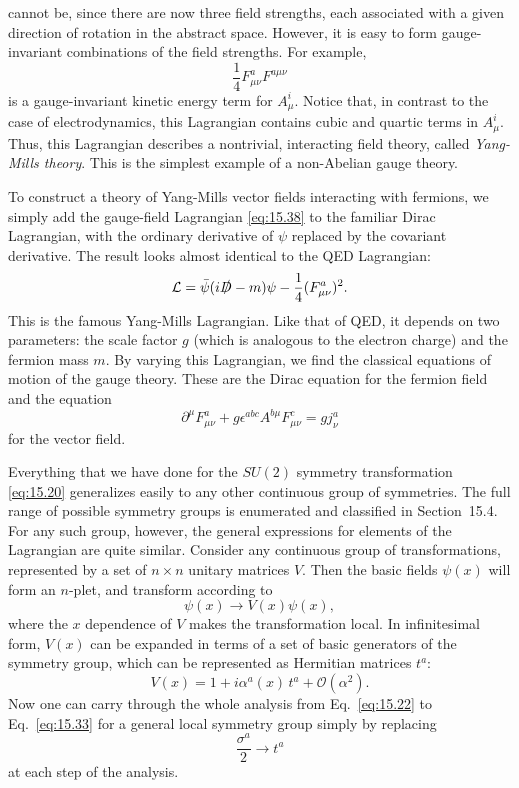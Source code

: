 cannot be, since there are now three field strengths, each associated with a
given direction of rotation in the abstract space.  However, it is easy to
form gauge-invariant combinations of the field strengths.  For example,
\begin{equation}
  \frac{1}{4}F^a_{\mu\nu}F^{a\mu\nu}
  \label{eq:15.38}
\end{equation}
is a gauge-invariant kinetic energy term for $A_\mu^i$.  Notice that, in
contrast to the case of electrodynamics, this Lagrangian contains cubic and
quartic terms in $A_\mu^i$.  Thus, this Lagrangian describes a nontrivial,
interacting field theory, called \emph{Yang-Mills theory}.  This is the
simplest example of a non-Abelian gauge theory.

To construct a theory of Yang-Mills vector fields interacting with fermions,
we simply add the gauge-field Lagrangian \eqref{eq:15.38} to the familiar
Dirac Lagrangian, with the ordinary derivative of $\psi$ replaced by the
covariant derivative.  The result looks almost identical to the QED
Lagrangian:
\begin{equation}
  \mathcal{L} = \bar{\psi}(i\slashed{D} - m)\psi - \frac{1}{4}(F^a_{\mu\nu})^2 .
  \label{eq:15.39}
\end{equation}
This is the famous Yang-Mills Lagrangian.  Like that of QED, it depends on
two parameters: the scale factor $g$ (which is analogous to the electron
charge) and the fermion mass $m$.  By varying this Lagrangian, we find the
classical equations of motion of the gauge theory.  These are the Dirac
equation for the fermion field and the equation
\begin{equation}
  \partial^\mu F^a_{\mu\nu} + g\epsilon^{abc}A^{b\mu}F^c_{\mu\nu} = gj^a_\nu
  \label{eq:15.40}
\end{equation}
for the vector field.

Everything that we have done for the $SU(2)$ symmetry transformation
\eqref{eq:15.20} generalizes easily to any other continuous group of
symmetries.  The full range of possible symmetry groups is enumerated and
classified in Section~15.4.  For any such group, however, the general
expressions for elements of the Lagrangian are quite similar.  Consider any
continuous group of transformations, represented by a set of $n\times n$
unitary matrices $V$.  Then the basic fields $\psi(x)$ will form an $n$-plet,
and transform according to
\begin{equation}
  \psi(x) \to V(x)\psi(x) ,
  \label{eq:15.41}
\end{equation}
where the $x$ dependence of $V$ makes the transformation local.  In
infinitesimal form, $V(x)$ can be expanded in terms of a set of basic
generators of the symmetry group, which can be represented as Hermitian
matrices $t^a$:
\begin{equation}
  V(x) = 1 + i\alpha^a(x)\,t^a + \mathcal{O}(\alpha^2) .
  \label{eq:15.42}
\end{equation}
Now one can carry through the whole analysis from Eq.~\eqref{eq:15.22} to
Eq.~\eqref{eq:15.33} for a general local symmetry group simply by replacing
\begin{equation}
  \frac{\sigma^a}{2} \to t^a
  \label{eq:15.43}
\end{equation}
at each step of the analysis.

